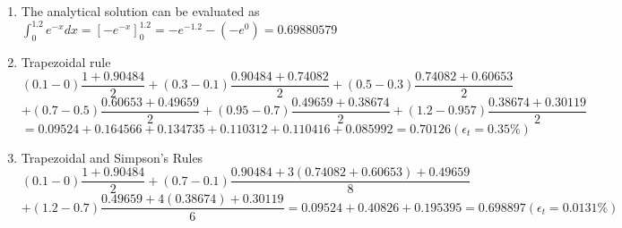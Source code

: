 \documentclass[../main.tex]{subfiles}
\begin{document}
\section{}
\begin{enumerate}[label=\bfseries(\alph*)]
\item The analytical solution can be evaluated as
	\bigbreak
$\displaystyle\int_{0}^{1.2} e^{-x} d x=\left[-e^{-x}\right]_{0}^{1.2}=-e^{-1.2}-\left(-e^{0}\right)=0.69880579$
	\bigbreak

\item  Trapezoidal rule
	\bigbreak
$(0.1-0) \dfrac{1+0.90484}{2}+(0.3-0.1) \dfrac{0.90484+0.74082}{2}+(0.5-0.3) \dfrac{0.74082+0.60653}{2}$
	\bigbreak
$+(0.7-0.5) \dfrac{0.60653+0.49659}{2}+(0.95-0.7) \dfrac{0.49659+0.38674}{2}+(1.2-0.957) \dfrac{0.38674+0.30119}{2}$
	\bigbreak
$=0.09524+0.164566+0.134735+0.110312+0.110416+0.085992=0.70126\left(\epsilon_{t}=0.35 \%\right)$
	\bigbreak

\item Trapezoidal and Simpson’s Rules
	\bigbreak
$(0.1-0) \dfrac{1+0.90484}{2}+(0.7-0.1) \dfrac{0.90484+3(0.74082+0.60653)+0.49659}{8}$
	\bigbreak
$+(1.2-0.7) \dfrac{0.49659+4(0.38674)+0.30119}{6}=0.09524+0.40826+0.195395=0.698897\left(\epsilon_{t}=0.0131 \%\right)$ 
	\bigbreak
\end{enumerate}
\end{document}
